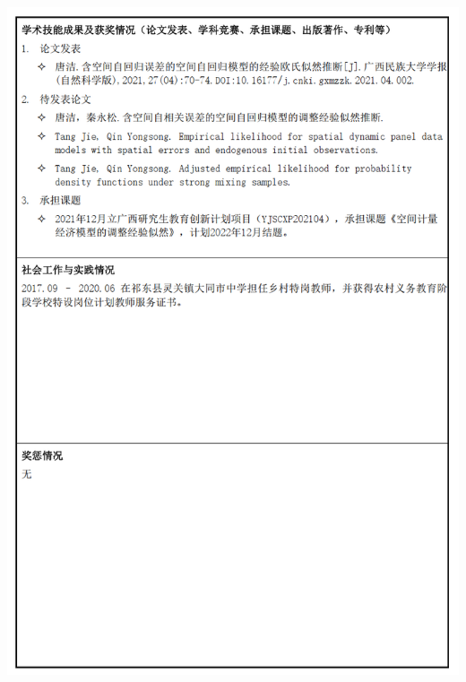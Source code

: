\documentclass[UFT8]{ctexart}%
\begin{document}
\begin{center}
  \includegraphics[scale=0.5]{figs/硕士就业推荐表3.JPG }

\end{center}
\end{document}
